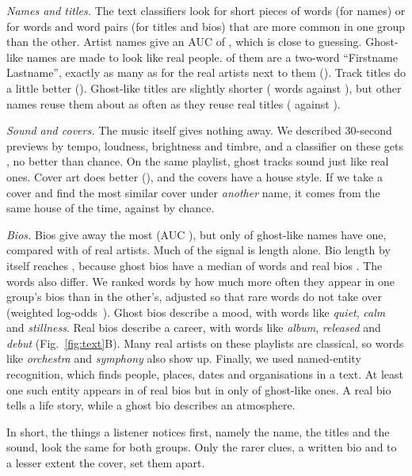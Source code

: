 \documentclass[9pt,twocolumn,twoside]{pnas-new}
\begin{document}
\emph{Names and titles.} The text classifiers look for short pieces of words (for names) or for words and word pairs (for titles and bios) that are more common in one group than the other. Artist names give an AUC of \aucName, which is close to guessing. Ghost-like names are made to look like real people. \personGhost{} of them are a two-word ``Firstname Lastname'', exactly as many as for the real artists next to them (\personRealF). Track titles do a little better (\aucTitles). Ghost-like titles are slightly shorter (\titleWordsGhost{} words against \titleWordsReal), but other names reuse them about as often as they reuse real titles (\titleReuseGhost{} against \titleReuseReal).

\emph{Sound and covers.} The music itself gives nothing away. We described \nAudio{} 30-second previews by tempo, loudness, brightness and timbre, and a classifier on these gets \aucAudio{}, no better than chance. On the same playlist, ghost tracks sound just like real ones. Cover art does better (\aucCover), and the covers have a house style. If we take a cover and find the most similar cover under \emph{another} name, it comes from the same house \coverSameHouse{} of the time, against \coverSameHouseNull{} by chance.

\emph{Bios.} Bios give away the most (AUC \aucBio), but only \bioGhost{} of ghost-like names have one, compared with \bioReal{} of real artists. Much of the signal is length alone. Bio length by itself reaches \aucBioLength, because ghost bios have a median of \tokGhost{} words and real bios \tokReal. The words also differ. We ranked words by how much more often they appear in one group's bios than in the other's, adjusted so that rare words do not take over (weighted log-odds~\cite{monroe2008fightin}). Ghost bios describe a mood, with words like \emph{quiet}, \emph{calm} and \emph{stillness}. Real bios describe a career, with words like \emph{album}, \emph{released} and \emph{debut} (Fig.~\ref{fig:text}B). Many real artists on these playlists are classical, so words like \emph{orchestra} and \emph{symphony} also show up. Finally, we used named-entity recognition, which finds people, places, dates and organisations in a text. At least one such entity appears in \entReal{} of real bios but in only \entGhost{} of ghost-like ones. A real bio tells a life story, while a ghost bio describes an atmosphere.

In short, the things a listener notices first, namely the name, the titles and the sound, look the same for both groups. Only the rarer clues, a written bio and to a lesser extent the cover, set them apart.
\end{document}

